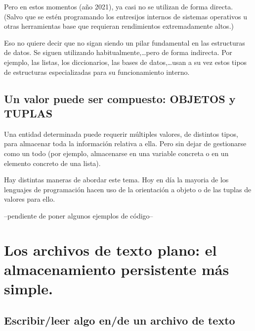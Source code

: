 \documentclass[spanish,12pt,a4paper,final,oneside]{book}
\begin{document}
Pero en estos momentos (año 2021), ya casi no se utilizan de forma directa. {\footnotesize (Salvo que se estén programando los entresijos internos de sistemas operativos u otras herramientas base que requieran rendimientos extremadamente altos.)}

Eso no quiere decir que no sigan siendo un pilar fundamental en las estructuras de datos. Se siguen utilizando habitualmente,\ldots pero de forma indirecta. Por ejemplo, las listas, los diccionarios, las bases de datos,\ldots usan a su vez estos tipos de estructuras especializadas para su funcionamiento interno.

\section{Un valor puede ser compuesto: OBJETOS y TUPLAS}
Una entidad determinada puede requerir múltiples valores, de distintos tipos, para  almacenar toda la información relativa a ella. Pero sin dejar de gestionarse como un todo (por ejemplo, almacenarse en una variable concreta o en un elemento concreto de una lista).

Hay distintas maneras de abordar este tema. Hoy en día la mayoria de los lenguajes de programación hacen uso de la orientación a objeto o de las tuplas de valores para ello.


\vspace{1cm}
--pendiente de poner algunos ejemplos de código--


\chapter{Los archivos de texto plano: el almacenamiento persistente más simple.}

\section{Escribir/leer algo en/de un archivo de texto}
\end{document}
